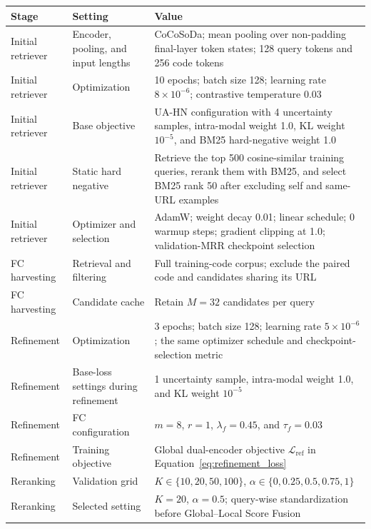 \documentclass[11pt]{article}
\begin{document}
\begin{table}[!t]
  \centering
  \scriptsize
  \setlength{\tabcolsep}{5.0pt}
  \begin{tabular}{p{}p{}p{}}
    \toprule
    Stage & Setting & Value \\
    \midrule
    Initial retriever & Encoder, pooling, and input lengths & CoCoSoDa; mean pooling over non-padding final-layer token states; 128 query tokens and 256 code tokens \\
    Initial retriever & Optimization & 10 epochs; batch size 128; learning rate \(8\times10^{-6}\); contrastive temperature 0.03 \\
    Initial retriever & Base objective & UA-HN configuration with 4 uncertainty samples, intra-modal weight 1.0, KL weight \(10^{-5}\), and BM25 hard-negative weight 1.0 \\
    Initial retriever & Static hard negative & Retrieve the top 500 cosine-similar training queries, rerank them with BM25, and select BM25 rank 50 after excluding self and same-URL examples \\
    Initial retriever & Optimizer and selection & AdamW; weight decay 0.01; linear schedule; 0 warmup steps; gradient clipping at 1.0; validation-MRR checkpoint selection \\
    \midrule
    FC harvesting & Retrieval and filtering & Full training-code corpus; exclude the paired code and candidates sharing its URL \\
    FC harvesting & Candidate cache & Retain \(M=32\) candidates per query \\
    \midrule
    Refinement & Optimization & 3 epochs; batch size 128; learning rate \(5\times10^{-6}\); the same optimizer schedule and checkpoint-selection metric \\
    Refinement & Base-loss settings during refinement & 1 uncertainty sample, intra-modal weight 1.0, and KL weight \(10^{-5}\) \\
    Refinement & FC configuration & \(m=8\), \(r=1\), \(\lambda_f=0.45\), and \(\tau_f=0.03\) \\
    Refinement & Training objective & Global dual-encoder objective \(\mathcal{L}_{\mathrm{ref}}\) in Equation~\ref{eq:refinement_loss} \\
    \midrule
    Reranking & Validation grid & \(K\in\{10,20,50,100\}\), \(\alpha\in\{0,0.25,0.5,0.75,1\}\) \\
    Reranking & Selected setting & \(K=20\), \(\alpha=0.5\); query-wise standardization before Global--Local Score Fusion \\

\end{tabular}
\end{table}
\end{document}
